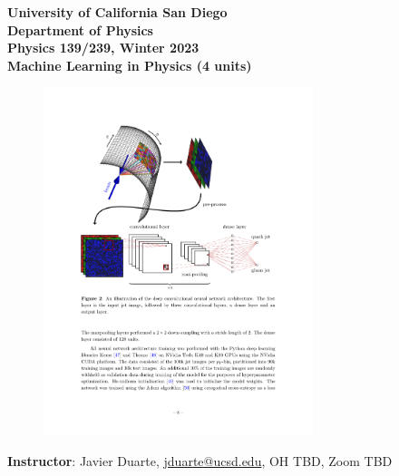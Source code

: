 \documentclass[12pt]{article}
\begin{document}
\begin{center}
	\textbf{University of California San Diego\\
		Department of Physics\\
		Physics 139/239, Winter 2023\\
		Machine Learning in Physics (4 units)}
\end{center}

\begin{figure}[h!]
	\centering
	\includegraphics[width=0.7\textwidth]{quark_gluon.pdf}
\end{figure}

\noindent\textbf{Instructor}: Javier Duarte, \href{mailto:jduarte@ucsd.edu}{jduarte@ucsd.edu}, OH TBD, Zoom TBD

\end{document}
